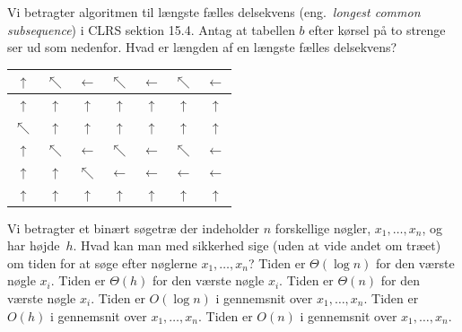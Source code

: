 Vi betragter algoritmen til længste fælles delsekvens (eng.~\emph{longest common subsequence}) i CLRS sektion 15.4.
Antag at tabellen $b$ efter kørsel på to strenge ser ud som nedenfor.
Hvad er længden af en længste fælles delsekvens?
\begin{center}
\begin{tabular}{|c|c|c|c|c|c|c|}
    \hline
    $\uparrow$ & $\nwarrow$ & $\leftarrow$ & $\nwarrow$ & $\leftarrow$ & $\nwarrow$ & $\leftarrow$ \\
    \hline
    $\uparrow$ & $\uparrow$ & $\uparrow$ & $\uparrow$ & $\uparrow$ & $\uparrow$ & $\uparrow$ \\
    \hline
    $\nwarrow$ & $\uparrow$ & $\uparrow$ & $\uparrow$ & $\uparrow$ & $\uparrow$ & $\uparrow$ \\
    \hline
    $\uparrow$ & $\nwarrow$ & $\leftarrow$ & $\nwarrow$ & $\leftarrow$ & $\nwarrow$ & $\leftarrow$ \\
    \hline
    $\uparrow$ & $\uparrow$ & $\nwarrow$ & $\leftarrow$ & $\leftarrow$ & $\leftarrow$ & $\leftarrow$ \\
    \hline
    $\uparrow$ & $\uparrow$ & $\uparrow$ & $\uparrow$ & $\uparrow$ & $\uparrow$ & $\uparrow$ \\
    \hline
\end{tabular}
\end{center}
\etsvar
\mulighederstart
{}
\korrekt
{}
\mulighederslut
{}


Vi betragter et binært søgetræ der indeholder $n$ forskellige nøgler, $x_1,\dots,x_n$, og har højde~$h$.
Hvad kan man med sikkerhed sige (uden at vide andet om træet) om tiden for at søge efter nøglerne $x_1,\dots,x_n$?
\fleresvar
\mulighederstart
\svar Tiden er $\Theta(\log n)$ for den værste nøgle $x_i$.
\svar Tiden er $\Theta(h)$ for den værste nøgle $x_i$. \korrekt
\svar Tiden er $\Theta(n)$  for den værste nøgle $x_i$.
\svar Tiden er $O(\log n)$ i gennemsnit over $x_1,\dots,x_n$.
\svar Tiden er $O(h)$ i gennemsnit over $x_1,\dots,x_n$. \korrekt
\svar Tiden er $O(n)$ i gennemsnit over $x_1,\dots,x_n$. \korrekt
\mulighederslut
{}


